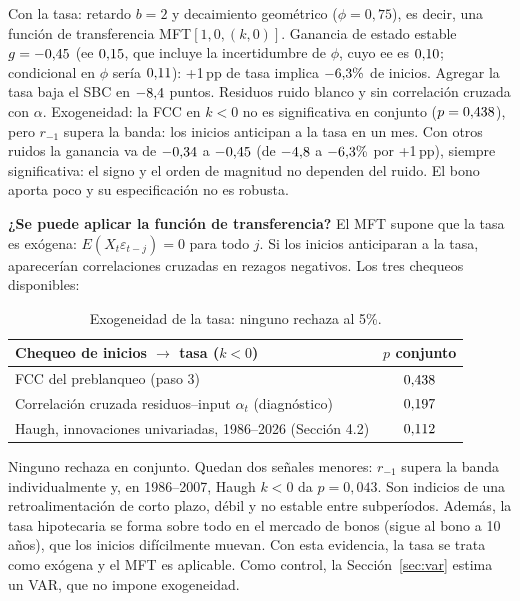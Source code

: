 \documentclass[11pt,a4paper]{article}
\begin{document}
\par Con la tasa: retardo $b=2$ y decaimiento geom\'etrico ($\phi=0{,}75$), es decir, una funci\'on de transferencia MFT$[1,0,(k,0)]$. Ganancia de estado estable $g=-0{,}45$ (ee $0{,}15$, que incluye la incertidumbre de $\phi$, cuyo ee es $0{,}10$; condicional en $\phi$ ser\'ia $0{,}11$): +1\,pp de tasa implica $-6{,}3\%$ de inicios. Agregar la tasa baja el SBC en $-8{,}4$ puntos. Residuos ruido blanco y sin correlaci\'on cruzada con $\alpha$. Exogeneidad: la FCC en $k<0$ no es significativa en conjunto ($p=0{,}438$), pero $r_{-1}$ supera la banda: los inicios anticipan a la tasa en un mes. Con otros ruidos la ganancia va de $-0{,}34$ a $-0{,}45$ (de $-4{,}8$ a $-6{,}3\%$ por +1\,pp), siempre significativa: el signo y el orden de magnitud no dependen del ruido. El bono aporta poco y su especificaci\'on no es robusta.

\textbf{¿Se puede aplicar la funci\'on de transferencia?} El MFT supone que la tasa es ex\'ogena: $E(X_t\varepsilon_{t-j})=0$ para todo $j$. Si los inicios anticiparan a la tasa, aparecer\'ian correlaciones cruzadas en rezagos negativos. Los tres chequeos disponibles:
\begin{table}[H]\centering\small
\begin{tabular}{lc}
\toprule
Chequeo de inicios $\to$ tasa ($k<0$) & $p$ conjunto \\
\midrule
FCC del preblanqueo (paso 3) & $0{,}438$ \\
Correlaci\'on cruzada residuos--input $\alpha_t$ (diagn\'ostico) & $0{,}197$ \\
Haugh, innovaciones univariadas, 1986--2026 (Secci\'on 4.2) & $0{,}112$ \\
\bottomrule
\end{tabular}
\caption{Exogeneidad de la tasa: ninguno rechaza al 5\%.}
\end{table}
Ninguno rechaza en conjunto. Quedan dos se\~nales menores: $r_{-1}$ supera la banda individualmente y, en 1986--2007, Haugh $k<0$ da $p=0{,}043$. Son indicios de una retroalimentaci\'on de corto plazo, d\'ebil y no estable entre subper\'iodos. Adem\'as, la tasa hipotecaria se forma sobre todo en el mercado de bonos (sigue al bono a 10 a\~nos), que los inicios dif\'icilmente muevan. Con esta evidencia, la tasa se trata como ex\'ogena y el MFT es aplicable. Como control, la Secci\'on~\ref{sec:var} estima un VAR, que no impone exogeneidad.

\end{document}
